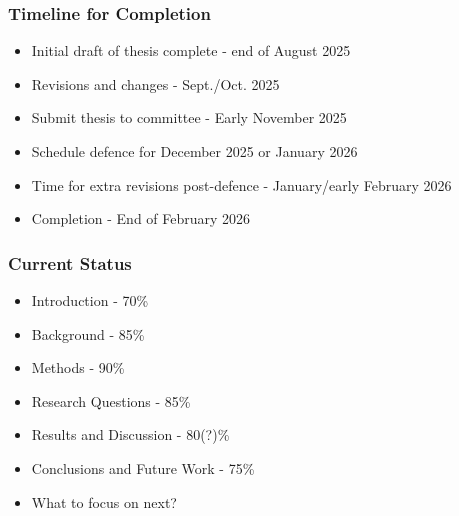 \documentclass[t]{beamer}
\begin{document}
\begin{frame}
	\frametitle{Timeline for Completion}
	\begin{itemize}
    	\item Initial draft of thesis complete - end of August 2025
    	\item Revisions and changes - Sept./Oct. 2025
    	\item Submit thesis to committee - Early November 2025
    	\item Schedule defence for December 2025 or January 2026
    	\item Time for extra revisions post-defence - January/early February 2026
    	\item Completion - End of February 2026
	\end{itemize}
\end{frame}

\begin{frame}
	\frametitle{Current Status}
	\begin{itemize}
		\item Introduction - 70\%
		\item Background - 85\%
		\item Methods - 90\%
		\item Research Questions - 85\%
		\item Results and Discussion - 80(?)\%
		\item Conclusions and Future Work - 75\%
		\item What to focus on next?
	\end{itemize}
\end{frame}
\end{document}

